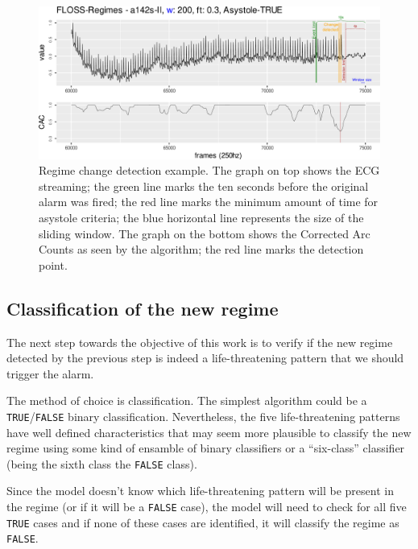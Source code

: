 \documentclass[runningheads]{llncs}
\begin{document}
\begin{figure}

{\centering \includegraphics[width=1\linewidth]{../../docs/figure/graph_regime_floss} 

}

\caption{Regime change detection example. The graph on top shows the ECG streaming; the  green line marks the ten seconds before the original alarm was fired; the red line marks the minimum amount of time for asystole criteria; the blue horizontal line represents the size of the sliding window. The graph on the bottom shows the Corrected Arc Counts as seen by the algorithm; the red line marks the detection point.}\label{fig:flossregime}
\end{figure}

\hypertarget{classification-of-the-new-regime}{%
\subsection{Classification of the new regime}\label{classification-of-the-new-regime}}

The next step towards the objective of this work is to verify if the new regime detected by the
previous step is indeed a life-threatening pattern that we should trigger the alarm.

The method of choice is classification. The simplest algorithm could be a \texttt{TRUE}/\texttt{FALSE} binary
classification. Nevertheless, the five life-threatening patterns have well defined characteristics
that may seem more plausible to classify the new regime using some kind of ensamble of binary
classifiers or a ``six-class'' classifier (being the sixth class the \texttt{FALSE} class).

Since the model doesn't know which life-threatening pattern will be present in the regime (or if it
will be a \texttt{FALSE} case), the model will need to check for all five \texttt{TRUE} cases and if none of these
cases are identified, it will classify the regime as \texttt{FALSE}.
\end{document}
